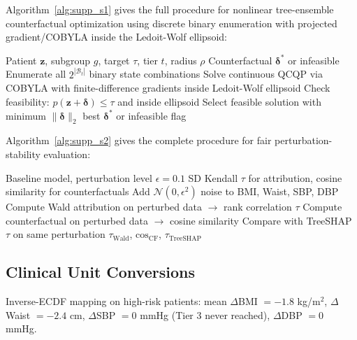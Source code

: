 \documentclass[11pt,a4paper]{article}
\theoremstyle{plain}
\begin{document}
Algorithm~\ref{alg:supp_s1} gives the full procedure for nonlinear tree-ensemble counterfactual optimization using discrete binary enumeration with projected gradient/COBYLA inside the Ledoit-Wolf ellipsoid:

\begin{algorithm}[htbp]
\caption{Supplementary Algorithm S1: Nonlinear Tree-Ensemble Counterfactual}
\label{alg:supp_s1}
\begin{algorithmic}[1]
\Require Patient $\mathbf z$, subgroup $g$, target $\tau$, tier $t$, radius $\rho$
\Ensure Counterfactual $\boldsymbol\delta^*$ or infeasible
\State Enumerate all $2^{|\mathcal B_t|}$ binary state combinations
  \State Solve continuous QCQP via COBYLA with finite-difference gradients inside Ledoit-Wolf ellipsoid
  \State Check feasibility: $p(\mathbf z + \boldsymbol\delta) \le \tau$ and inside ellipsoid
\EndFor
\State Select feasible solution with minimum $\|\boldsymbol\delta\|_2$
\State \Return best $\boldsymbol\delta^*$ or infeasible flag
\end{algorithmic}
\end{algorithm}

Algorithm~\ref{alg:supp_s2} gives the complete procedure for fair perturbation-stability evaluation:

\begin{algorithm}[htbp]
\caption{Supplementary Algorithm S2: Fair Perturbation-Stability Evaluation}
\label{alg:supp_s2}
\begin{algorithmic}[1]
\Require Baseline model, perturbation level $\epsilon=0.1$ SD
\Ensure Kendall $\tau$ for attribution, cosine similarity for counterfactuals
\State Add $\mathcal N(0, \epsilon^2)$ noise to BMI, Waist, SBP, DBP
\State Compute Wald attribution on perturbed data $\to$ rank correlation $\tau$
\State Compute counterfactual on perturbed data $\to$ cosine similarity
\State Compare with TreeSHAP $\tau$ on same perturbation
\State \Return $\tau_{\text{Wald}}$, $\text{cos}_{\text{CF}}$, $\tau_{\text{TreeSHAP}}$
\end{algorithmic}
\end{algorithm}

\subsection{Clinical Unit Conversions}

Inverse-ECDF mapping on high-risk patients: mean $\Delta$BMI $= -1.8$ kg/m$^2$, $\Delta$Waist $= -2.4$ cm, $\Delta$SBP $= 0$ mmHg (Tier 3 never reached), $\Delta$DBP $= 0$ mmHg.
\end{document}
